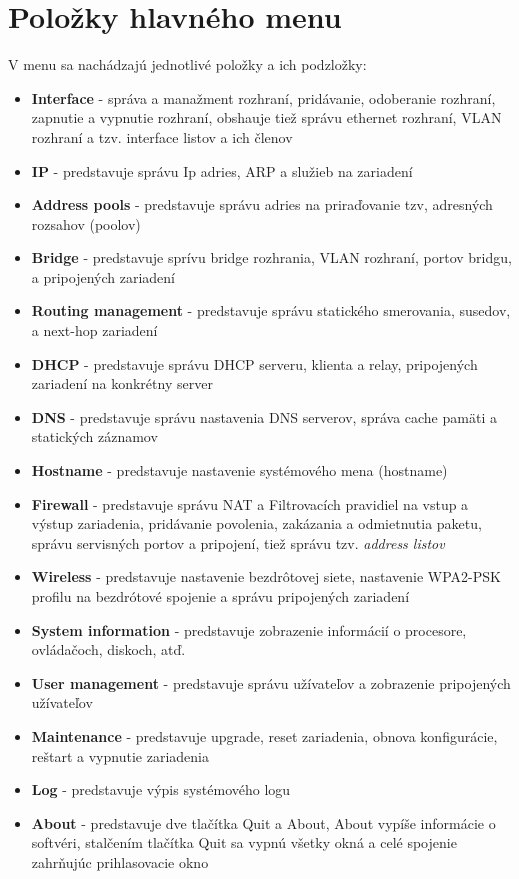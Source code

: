 \section{Položky hlavného menu}
V menu sa nachádzajú jednotlivé položky a ich podzložky:
\begin{itemize}
\item \textbf{Interface} - správa a manažment rozhraní, pridávanie, odoberanie rozhraní, zapnutie a vypnutie rozhraní, obshauje tiež správu ethernet rozhraní, VLAN rozhraní a tzv. interface listov a ich členov
\item \textbf{IP} - predstavuje správu Ip adries, ARP a služieb na zariadení
\item \textbf{Address pools} - predstavuje správu adries na priraďovanie tzv, adresných rozsahov (poolov)
\item \textbf{Bridge} - predstavuje sprívu bridge rozhrania, VLAN rozhraní, portov bridgu, a pripojených zariadení
\item \textbf{Routing management} - predstavuje správu statického smerovania, susedov, a next-hop zariadení
\item \textbf{DHCP} - predstavuje správu DHCP serveru, klienta a relay, pripojených zariadení na konkrétny server
\item \textbf{DNS} - predstavuje správu nastavenia DNS serverov, správa cache pamäti a statických záznamov
\item \textbf{Hostname} - predstavuje nastavenie systémového mena (hostname)
\item \textbf{Firewall} - predstavuje správu NAT a Filtrovacích pravidiel na vstup a výstup zariadenia, pridávanie povolenia, zakázania  a odmietnutia paketu, správu servisných portov a pripojení, tiež správu tzv. \textit{address listov}
\item \textbf{Wireless} - predstavuje nastavenie bezdrôtovej siete, nastavenie WPA2-PSK profilu na bezdrótové spojenie  a správu pripojených zariadení
\item  \textbf{System information} - predstavuje zobrazenie informácií o procesore,  ovládačoch, diskoch, atď.
\item \textbf{User management} - predstavuje správu užívateľov a zobrazenie pripojených užívateľov
\item \textbf{Maintenance} - predstavuje upgrade, reset zariadenia, obnova konfigurácie, reštart a vypnutie zariadenia
\item \textbf{Log} - predstavuje výpis systémového logu
\item \textbf{About} - predstavuje dve tlačítka Quit a About, About vypíše informácie o softvéri, stalčením tlačítka  Quit sa vypnú všetky okná a celé spojenie zahrňujúc prihlasovacie okno 
\end{itemize}
